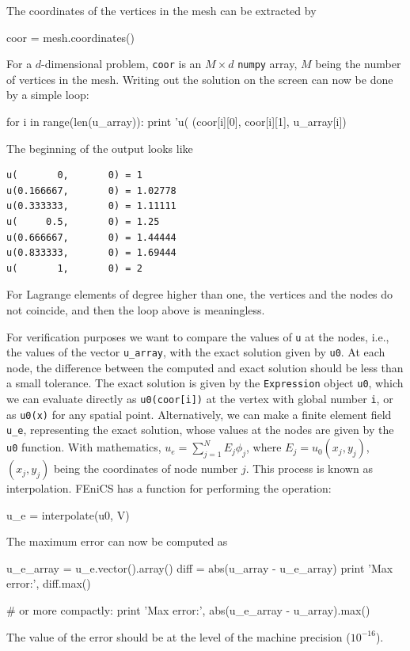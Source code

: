 The coordinates of the vertices in the mesh can be extracted
by
\begin{python}
coor = mesh.coordinates()
\end{python}
For a $d$-dimensional problem, {\fontsize{10pt}{10pt}\verb!coor!} is an $M\times d$ 
{\fontsize{10pt}{10pt}\texttt{numpy}} array,
$M$ being the number of vertices in the mesh. Writing out the solution
on the screen can now be done by a simple loop:
\begin{python}
for i in range(len(u_array)):
    print 'u(%
          (coor[i][0], coor[i][1], u_array[i])
\end{python}
The beginning of the output looks like
\begin{Verbatim}[fontsize=\fontsize{10pt}{10pt},tabsize=8,baselinestretch=0.85,
fontfamily=tt,xleftmargin=7mm]
u(       0,       0) = 1
u(0.166667,       0) = 1.02778
u(0.333333,       0) = 1.11111
u(     0.5,       0) = 1.25
u(0.666667,       0) = 1.44444
u(0.833333,       0) = 1.69444
u(       1,       0) = 2
\end{Verbatim}
\noindent
For Lagrange elements of
degree higher than one, 
the vertices and the nodes do not coincide, and then
the loop above is meaningless.

For verification purposes we want to compare the values of {\fontsize{10pt}{10pt}\verb!u!}
at the nodes, i.e., the values of the vector {\fontsize{10pt}{10pt}\verb!u_array!}, with
the exact solution given by {\fontsize{10pt}{10pt}\verb!u0!}. At each node, the difference
between the computed and exact solution should be less than a
small tolerance. The exact solution is given by the {\fontsize{10pt}{10pt}\texttt{Expression}}
object {\fontsize{10pt}{10pt}\texttt{u0}}, which we can evaluate directly as
{\fontsize{10pt}{10pt}\texttt{u0(coor[i])}} at the vertex with global number {\fontsize{10pt}{10pt}\texttt{i}}, or as
{\fontsize{10pt}{10pt}\texttt{u0(x)}} for any spatial point.
Alternatively, we can make a finite element field {\fontsize{10pt}{10pt}\verb!u_e!}, representing
the exact solution, whose values at the nodes are given by the
{\fontsize{10pt}{10pt}\texttt{u0}} function. With mathematics, $u_e = \sum_{j=1}^N  E_j\phi_j$, where
$E_j=u_0(x_j,y_j)$, $(x_j,y_j)$ being the coordinates of node number $j$.
This process is known as interpolation.
FEniCS has a function for performing the operation:
\begin{python}
u_e = interpolate(u0, V)
\end{python}
The maximum error can now be computed as
\begin{python}
u_e_array = u_e.vector().array()
diff = abs(u_array - u_e_array)
print 'Max error:', diff.max()

# or more compactly:
print 'Max error:', abs(u_e_array - u_array).max()
\end{python}
The value of the error should be at the level of the machine precision
($10^{-16}$).

